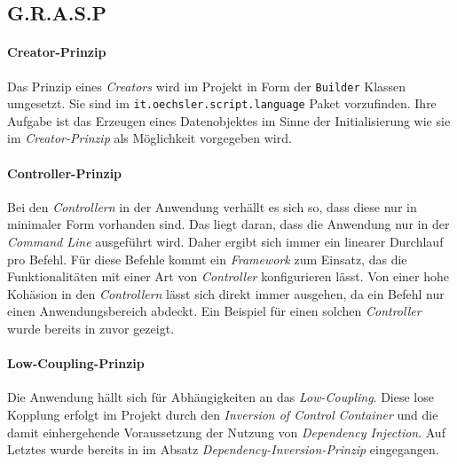 \bgroup

    \label{lst:apply_command}
\egroup

\subsection{G.R.A.S.P}
\label{subsec:grasp}

\paragraph{Creator-Prinzip}

Das Prinzip eines \emph{Creators} wird im Projekt in Form der \texttt{Builder} Klassen umgesetzt.
Sie sind im \texttt{it.oechsler.script.language} Paket vorzufinden.
Ihre Aufgabe ist das Erzeugen eines Datenobjektes im Sinne der Initialisierung wie sie im \emph{Creator-Prinzip} als Möglichkeit vorgegeben wird.

\paragraph{Controller-Prinzip}

Bei den \emph{Controllern} in der Anwendung verhällt es sich so, dass diese nur in minimaler Form vorhanden sind.
Das liegt daran, dass die Anwendung nur in der \emph{Command Line} ausgeführt wird.
Daher ergibt sich immer ein linearer Durchlauf pro Befehl.
Für diese Befehle kommt ein \emph{Framework} zum Einsatz, das die Funktionalitäten mit einer Art von \emph{Controller} konfigurieren lässt.
Von einer hohe Kohäsion in den \emph{Controllern} lässt sich direkt immer ausgehen, da ein Befehl nur einen Anwendungsbereich abdeckt.
Ein Beispiel für einen solchen \emph{Controller} wurde bereits in  zuvor gezeigt.

\paragraph{Low-Coupling-Prinzip}

Die Anwendung hällt sich für Abhängigkeiten an das \emph{Low-Coupling}.
Diese lose Kopplung erfolgt im Projekt durch den \emph{Inversion of Control} \emph{Container} und die damit einhergehende Voraussetzung der Nutzung von \emph{Dependency Injection}.
Auf Letztes wurde bereits in  im Absatz \emph{Dependency-Inversion-Prinzip} eingegangen.

